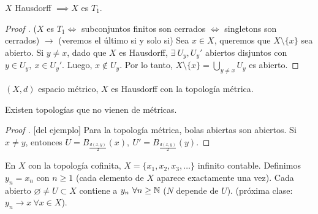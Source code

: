 \documentclass[a4paper]{report}
\begin{document}
	\begin{lemma}
		$X$ Hausdorff $\implies X$ es $T_1$.
	\end{lemma}

	\begin{proof}[Proof ]
		($X$ es $T_1 \iff$ subconjuntos finitos son cerrados $\iff$ singletons son cerrados) $\rightarrow$ (veremos el último si y solo si) Sea $x \in X$, queremos que $X \setminus \{x\}$ sea abierto. Si $y \neq x$, dado que $X$ es Hausdorff, $\exists\ U_y, U_y'$ abiertos disjuntos con $y \in U_y,\ x \in U_y'$. Luego, $x \not\in U_y$. Por lo tanto, $X \setminus \{ x \} = \displaystyle\bigcup_{y \neq x} U_y$ es abierto.
	\end{proof}

	\begin{eg}
		$(X,d)$ espacio métrico, $X$ es Hausdorff con la topología métrica.
	\end{eg}

	\begin{corollary}[secreto]
		Existen topologías que no vienen de métricas.
	\end{corollary}

	\begin{proof}[Proof ][del ejemplo]
		Para la topología métrica, bolas abiertas son abiertos. Si $x \neq y$, entonces $U = B_{\frac{d(x,y)}{2}}(x),\ U' = B_{\frac{d(x,y)}{2}}(y)$.
	\end{proof}

	En $X$ con la topología cofinita, $X = \{ x_1, x_2, x_3,\dots \}$ infinito contable. Definimos $y_n = x_n$ con $n \geq 1$ (cada elemento de $X$ aparece exactamente una vez). Cada abierto $\varnothing \neq U \subset X$ contiene a $y_n \ \forall n \geq \mathbb{N}$ ($N$ depende de $U$). (próxima clase: $y_n \to x \ \forall x \in X$). 
	


	







\end{document}
